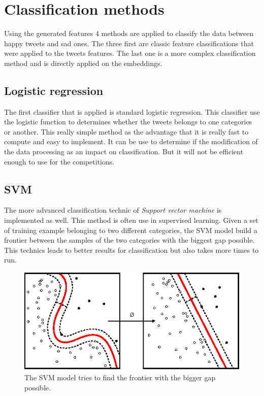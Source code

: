 \section{Classification methods}
Using the generated features 4 methods are applied to classify the data between happy tweets and sad ones. The three first are classic feature classifications that were applied to the tweets features. The last one is a more complex classification method and is directly applied on the embeddings.

\subsection{Logistic regression}
The first classifier that is applied is standard logistic regression. This classifier use the logistic function to determines whether the tweets belongs to one categories or another. This really simple method as the advantage that it is really fast to compute and easy to implement. It can be use to determine if the modification of the data processing as an impact on classification. But it will not be efficient enough to use for the competitions.

\subsection{SVM}
The more advanced classification technic of \textit{Support vector machine} is implemented as well. This method is often use in supervised learning. Given a set of training example belonging to two different categories, the SVM model build a frontier between the samples of the two categories with the biggest gap possible. This technics leads to better results for classification but also takes more times to run. 

\begin{figure}[h!]
\centering
	\includegraphics[scale=1.2]{SVM} 
\caption{The SVM model tries to find the frontier with the bigger gap possible. \cite{wikiSVM}}
\label{plot:SVM}
\end{figure}
\FloatBarrier

